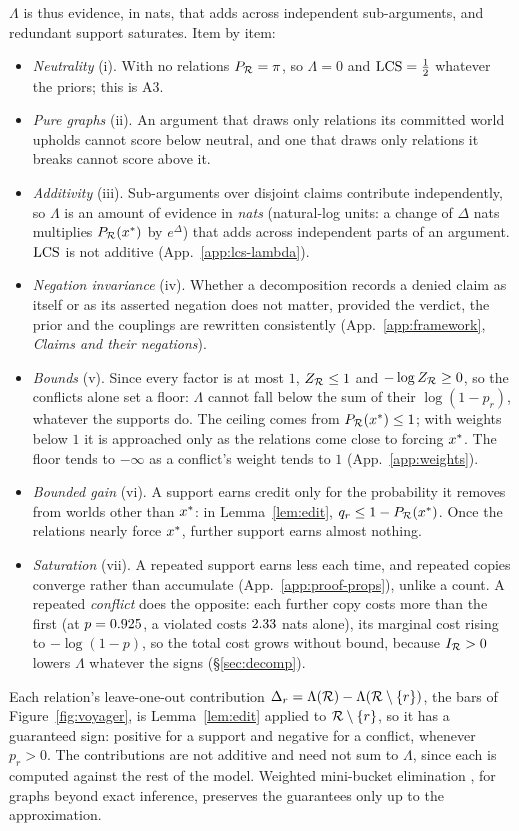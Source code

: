 $\Lambda$ is thus evidence, in nats, that adds across independent sub-arguments, and redundant
support saturates. Item by item:
\begin{itemize}[leftmargin=1.2em,itemsep=1pt,topsep=2pt]
\item \emph{Neutrality} (i). With no relations $P_{\mathcal{R}}=\pi$, so $\Lambda=0$ and $\mathrm{LCS}=\frac12$ whatever
  the priors; this is A3.
\item \emph{Pure graphs} (ii). An argument that draws only relations its committed world upholds
  cannot score below neutral, and one that draws only relations it breaks cannot score above it.
\item \emph{Additivity} (iii). Sub-arguments over disjoint claims contribute independently, so
  $\Lambda$ is an amount of evidence in \emph{nats} (natural-log units: a change of $\Delta$ nats
  multiplies $P_{\mathcal{R}}(x^{\ast})$ by $e^{\Delta}$) that adds across independent parts of an argument. $\mathrm{LCS}$ is
  not additive (App.~\ref{app:lcs-lambda}).
\item \emph{Negation invariance} (iv). Whether a decomposition records a denied claim as itself or
  as its asserted negation does not matter, provided the verdict, the prior and the couplings are
  rewritten consistently (App.~\ref{app:framework}, \emph{Claims and their negations}).
\item \emph{Bounds} (v). Since every factor is at most $1$, $Z_{\mathcal{R}}\le1$ and $-\log Z_{\mathcal{R}}\ge0$, so the
  conflicts alone set a floor: $\Lambda$ cannot fall below the sum of their $\log(1-p_r)$, whatever
  the supports do. The ceiling comes from $P_{\mathcal{R}}(x^{\ast})\le1$; with weights below $1$ it is approached
  only as the relations come close to forcing $x^{\ast}$. The floor tends to $-\infty$ as a conflict's
  weight tends to $1$ (App.~\ref{app:weights}).
\item \emph{Bounded gain} (vi). A support earns credit only for the probability it removes from
  worlds other than $x^{\ast}$: in Lemma~\ref{lem:edit}, $q_r\le1-P_{\mathcal{R}}(x^{\ast})$. Once the relations nearly
  force $x^{\ast}$, further support earns almost nothing.
\item \emph{Saturation} (vii). A repeated support earns less each time, and repeated copies converge
  rather than accumulate (App.~\ref{app:proof-props}), unlike a count. A repeated \emph{conflict} does the opposite: each further copy costs more than the first (at
$p=0.925$, a violated \con{} costs $2.33$ nats alone), its marginal cost rising to
$-\log(1-p)$, so the total cost grows without bound, because $I_{\mathcal{R}}>0$ lowers $\Lambda$ whatever the
signs (\S\ref{sec:decomp}).
\end{itemize}
Each relation's leave-one-out contribution $\Delta_r=\Lambda(\mathcal{R})-\Lambda(\mathcal{R}\setminus\{r\})$, the
bars of Figure~\ref{fig:voyager}, is Lemma~\ref{lem:edit} applied to $\mathcal{R}\setminus\{r\}$, so it has a
guaranteed sign: positive for a support and negative for a conflict, whenever $p_r>0$. The contributions are not
additive and need not sum to $\Lambda$, since each is computed against the rest of the model.
Weighted mini-bucket elimination \citep{wmb}, for graphs beyond exact inference, preserves the
guarantees only up to the approximation.
